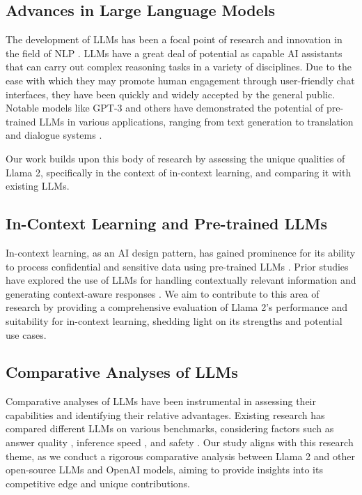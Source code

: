 \documentclass[conference]{IEEEtran}
\begin{document}
\subsection{Advances in Large Language Models}
The development of LLMs has been a focal point of research and innovation in the field of NLP \cite{kamalloo2023evaluating, sharir2020cost, xu2022survey}. LLMs have a great deal of potential as capable AI assistants that can carry out complex reasoning tasks in a variety of disciplines. Due to the ease with which they may promote human engagement through user-friendly chat interfaces, they have been quickly and widely accepted by the general public. 
Notable models like GPT-3 and others have demonstrated the potential of pre-trained LLMs in various applications, ranging from text generation to translation and dialogue systems \cite{wang2023cost, xu2022survey}. 

Our work builds upon this body of research by assessing the unique qualities of Llama 2, specifically in the context of in-context learning, and comparing it with existing LLMs.

\subsection{In-Context Learning and Pre-trained LLMs}
In-context learning, as an AI design pattern, has gained prominence for its ability to process confidential and sensitive data using pre-trained LLMs \cite{min2022rethinking}. Prior studies have explored the use of LLMs for handling contextually relevant information and generating context-aware responses \cite{cai2022context}. 
We aim to contribute to this area of research by providing a comprehensive evaluation of Llama 2's performance and suitability for in-context learning, shedding light on its strengths and potential use cases.

\subsection{Comparative Analyses of LLMs}
Comparative analyses of LLMs have been instrumental in assessing their capabilities and identifying their relative advantages. Existing research has compared different LLMs on various benchmarks, considering factors such as answer quality \cite{chen2023exploring}\cite{huang2024evaluation}, inference speed \cite{huang2024evaluation}\cite{zheng2023response}, and safety \cite{zhang2023safetybench}. 
Our study aligns with this research theme, as we conduct a rigorous comparative analysis between Llama 2 and other open-source LLMs and OpenAI models, aiming to provide insights into its competitive edge and unique contributions.
\end{document}
